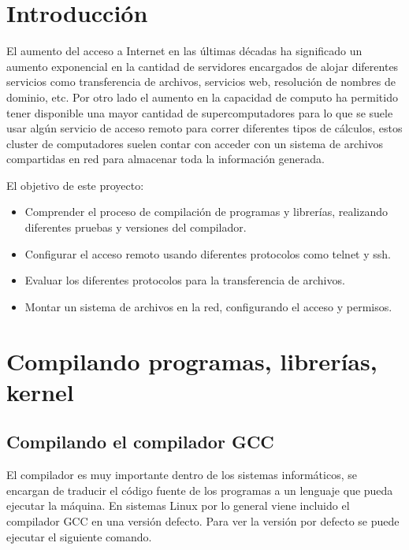 \documentclass[12pt]{article}
\begin{document}
\newpage
\pagestyle{plain}
\tableofcontents

\newpage
\listoffigures 


\newpage
\section{Introducción}

El aumento del acceso a Internet en las últimas décadas ha significado un aumento exponencial en la cantidad de servidores encargados de alojar diferentes servicios como transferencia de archivos, servicios web, resolución de nombres de dominio, etc. Por otro lado el aumento en la capacidad de computo ha permitido tener disponible una mayor cantidad de supercomputadores para lo que se suele usar algún servicio de acceso remoto para correr diferentes tipos de cálculos, estos cluster de computadores suelen contar con acceder con un sistema de archivos compartidas en red para almacenar toda la información generada. 

El objetivo de este proyecto:

\begin{itemize}
\item Comprender el proceso de compilación de programas y librerías, realizando diferentes pruebas y versiones del compilador.
\item Configurar el acceso remoto usando diferentes protocolos como telnet y ssh.
\item Evaluar los diferentes protocolos para la transferencia de archivos.
\item Montar un sistema de archivos en la red, configurando el acceso y permisos.
\end{itemize}    
\newpage
\section{Compilando programas, librerías, kernel}

\subsection{Compilando el compilador GCC}

El compilador es muy importante dentro de los sistemas informáticos, se encargan de traducir el código fuente de los programas a un lenguaje que pueda ejecutar la máquina. En sistemas Linux por lo general viene incluido el compilador GCC en una versión defecto. Para ver la versión por defecto se puede ejecutar el siguiente comando.
\end{document}
